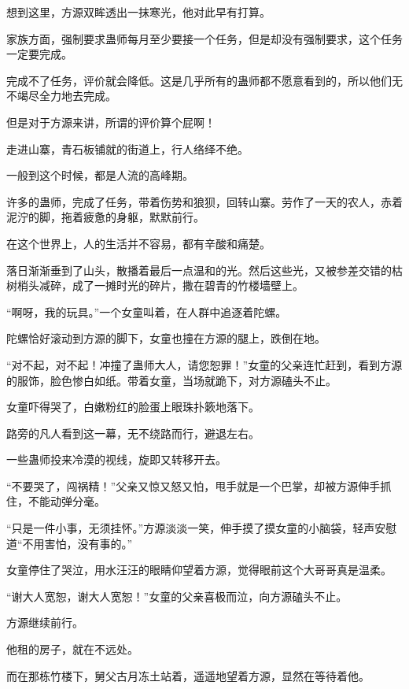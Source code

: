 \begin{this_body}
想到这里，方源双眸透出一抹寒光，他对此早有打算。

家族方面，强制要求蛊师每月至少要接一个任务，但是却没有强制要求，这个任务一定要完成。

完成不了任务，评价就会降低。这是几乎所有的蛊师都不愿意看到的，所以他们无不竭尽全力地去完成。

但是对于方源来讲，所谓的评价算个屁啊！

走进山寨，青石板铺就的街道上，行人络绎不绝。

一般到这个时候，都是人流的高峰期。

许多的蛊师，完成了任务，带着伤势和狼狈，回转山寨。劳作了一天的农人，赤着泥泞的脚，拖着疲惫的身躯，默默前行。

在这个世界上，人的生活并不容易，都有辛酸和痛楚。

落日渐渐垂到了山头，散播着最后一点温和的光。然后这些光，又被参差交错的枯树梢头减碎，成了一摊时光的碎片，撒在碧青的竹楼墙壁上。

“啊呀，我的玩具。”一个女童叫着，在人群中追逐着陀螺。

陀螺恰好滚动到方源的脚下，女童也撞在方源的腿上，跌倒在地。

“对不起，对不起！冲撞了蛊师大人，请您恕罪！”女童的父亲连忙赶到，看到方源的服饰，脸色惨白如纸。带着女童，当场就跪下，对方源磕头不止。

女童吓得哭了，白嫩粉红的脸蛋上眼珠扑簌地落下。

路旁的凡人看到这一幕，无不绕路而行，避退左右。

一些蛊师投来冷漠的视线，旋即又转移开去。

“不要哭了，闯祸精！”父亲又惊又怒又怕，甩手就是一个巴掌，却被方源伸手抓住，不能动弹分毫。

“只是一件小事，无须挂怀。”方源淡淡一笑，伸手摸了摸女童的小脑袋，轻声安慰道“不用害怕，没有事的。”

女童停住了哭泣，用水汪汪的眼睛仰望着方源，觉得眼前这个大哥哥真是温柔。

“谢大人宽恕，谢大人宽恕！”女童的父亲喜极而泣，向方源磕头不止。

方源继续前行。

他租的房子，就在不远处。

而在那栋竹楼下，舅父古月冻土站着，遥遥地望着方源，显然在等待着他。

\end{this_body}

